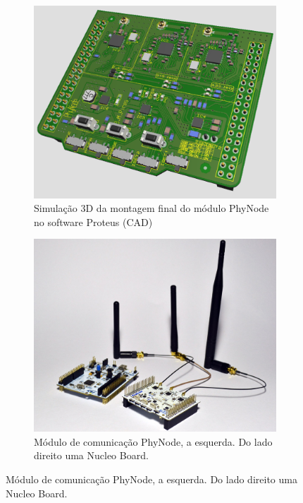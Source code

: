 \documentclass[
	12pt,				%
	openright,			%
	oneside,
	a4paper,			%
	english,			%
	french,				%
	spanish,			%
	brazil				%
	]{abntex2}
\begin{document}
\begin{figure}[hbt]
	\centering
	\caption{\label{fig_prototype}Protótipos do módulo PhyNode}
	\begin{subfigure}{.5\textwidth}
		\centering
		\includegraphics[width=.98\linewidth]{PhyNode_3D}
		\captionsetup{width=.9\textwidth}
		\caption{Simulação 3D da montagem final do módulo PhyNode no software Proteus (CAD)}
		\label{fig_prototype_3d}
	\end{subfigure}%
	\begin{subfigure}{.5\textwidth}
		\centering
		\includegraphics[width=.98\linewidth]{PhyNode_Assembled}
		\captionsetup{width=.9\linewidth}
		\caption{Módulo de comunicação PhyNode, a esquerda. Do lado direito uma Nucleo Board.}
		\label{fig_prototype_assembled}
	\end{subfigure}
\end{figure}
\end{document}
